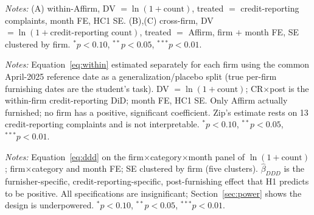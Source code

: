 \documentclass[12pt]{article}
\begin{document}
\begin{table}[htbp]\centering
\begin{threeparttable}
\caption{Difference-in-differences: no furnishing-specific effect}\label{tab:did}\small

\begin{tablenotes}\small\item \textit{Notes:} (A) within-Affirm, DV $=\ln(1+\text{count})$,
treated $=$ credit-reporting complaints, month FE, HC1 SE. (B),(C) cross-firm, DV $=\ln(1+
\text{credit-reporting count})$, treated $=$ Affirm, firm $+$ month FE, SE clustered by firm.
$^{*}p<0.10$, $^{**}p<0.05$, $^{***}p<0.01$.
\end{tablenotes}
\end{threeparttable}
\end{table}

\begin{table}[htbp]\centering
\begin{threeparttable}
\caption{Per-firm within-firm furnishing DiD: no lender shows a positive credit-reporting effect}\label{tab:hetero}\small

\begin{tablenotes}\small\item \textit{Notes:} Equation~\eqref{eq:within} estimated separately
for each firm using the common April-2025 reference date as a generalization/placebo split
(true per-firm furnishing dates are the student's task). DV $=\ln(1+\text{count})$; CR$\times$post
is the within-firm credit-reporting DiD; month FE, HC1 SE. Only Affirm actually furnished; no
firm has a positive, significant coefficient. Zip's estimate rests on 13 credit-reporting
complaints and is not interpretable. $^{*}p<0.10$, $^{**}p<0.05$, $^{***}p<0.01$.
\end{tablenotes}
\end{threeparttable}
\end{table}

\begin{table}[htbp]\centering
\begin{threeparttable}
\caption{Triple-difference: (Affirm vs.\ peers)$\times$(CR vs.\ other)$\times$post}\label{tab:tripleD}\small

\begin{tablenotes}\small\item \textit{Notes:} Equation~\eqref{eq:ddd} on the
firm$\times$category$\times$month panel of $\ln(1+\text{count})$; firm$\times$category and month
FE; SE clustered by firm (five clusters). $\hat\beta_{DDD}$ is the furnisher-specific,
credit-reporting-specific, post-furnishing effect that H1 predicts to be positive. All
specifications are insignificant; Section~\ref{sec:power} shows the design is underpowered.
$^{*}p<0.10$, $^{**}p<0.05$, $^{***}p<0.01$.
\end{tablenotes}
\end{threeparttable}
\end{table}
\end{document}
